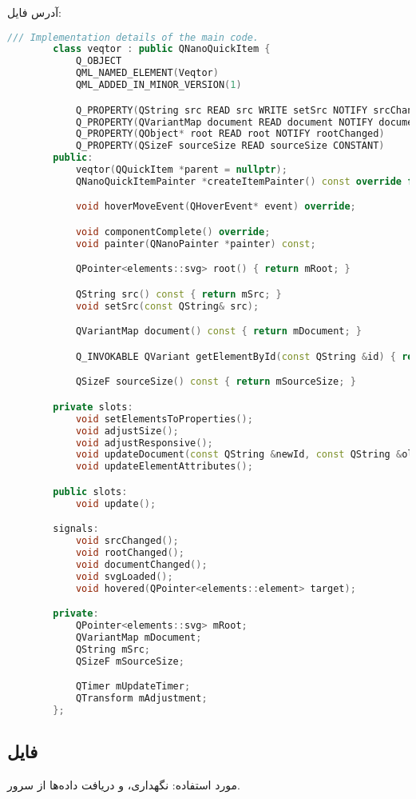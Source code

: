 آدرس فایل:
\hyperref{https://github.com/0smr/veqtor/veqtor.h}{}{}{}
\begin{latin}
	\small
	\begin{lstlisting}[language=C++, caption={C++ ٰVeqtor Root Class}]
		/// Implementation details of the main code.
		class veqtor : public QNanoQuickItem {
			Q_OBJECT
			QML_NAMED_ELEMENT(Veqtor)
			QML_ADDED_IN_MINOR_VERSION(1)

			Q_PROPERTY(QString src READ src WRITE setSrc NOTIFY srcChanged)
			Q_PROPERTY(QVariantMap document READ document NOTIFY documentChanged)
			Q_PROPERTY(QObject* root READ root NOTIFY rootChanged)
			Q_PROPERTY(QSizeF sourceSize READ sourceSize CONSTANT)
		public:
			veqtor(QQuickItem *parent = nullptr);
			QNanoQuickItemPainter *createItemPainter() const override final;

			void hoverMoveEvent(QHoverEvent* event) override;

			void componentComplete() override;
			void painter(QNanoPainter *painter) const;

			QPointer<elements::svg> root() { return mRoot; }

			QString src() const { return mSrc; }
			void setSrc(const QString& src);

			QVariantMap document() const { return mDocument; }

			Q_INVOKABLE QVariant getElementById(const QString &id) { return mDocument[id]; }

			QSizeF sourceSize() const { return mSourceSize; }

		private slots:
			void setElementsToProperties();
			void adjustSize();
			void adjustResponsive();
			void updateDocument(const QString &newId, const QString &oldId);
			void updateElementAttributes();

		public slots:
			void update();

		signals:
			void srcChanged();
			void rootChanged();
			void documentChanged();
			void svgLoaded();
			void hovered(QPointer<elements::element> target);

		private:
			QPointer<elements::svg> mRoot;
			QVariantMap mDocument;
			QString mSrc;
			QSizeF mSourceSize;

			QTimer mUpdateTimer;
			QTransform mAdjustment;
		};
	\end{lstlisting}
\end{latin}

\subsection{فایل }
مورد استفاده: نگهداری، و دریافت داده‌ها از سرور.

